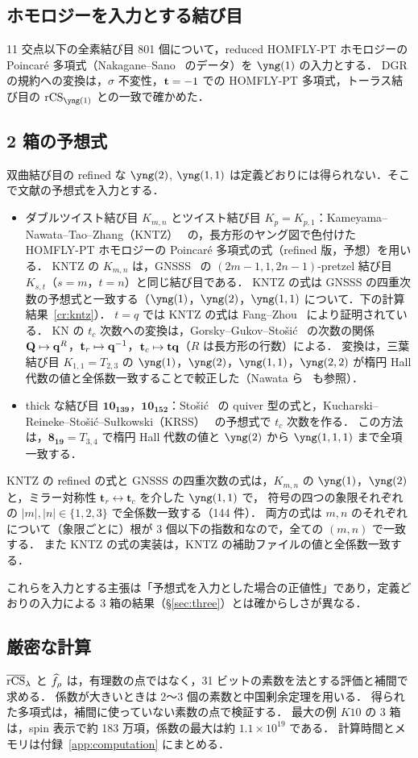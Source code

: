 \subsection{ホモロジーを入力とする結び目}
11 交点以下の全素結び目 801 個について，reduced HOMFLY-PT ホモロジーの Poincaré 多項式（Nakagane--Sano~\cite{Nakagane21} のデータ）を $\yng(1)$ の入力とする．
DGR の規約への変換は，$\sigma$ 不変性，$\mathbf{t}=-1$ での HOMFLY-PT 多項式，トーラス結び目の $\rCS_{\yng(1)}$ との一致で確かめた．

\subsection{2 箱の予想式}
双曲結び目の refined な $\yng(2)$, $\yng(1,1)$ は定義どおりには得られない．そこで文献の予想式を入力とする．
\begin{itemize}
\item ダブルツイスト結び目 $K_{m,n}$ とツイスト結び目 $K_p=K_{p,1}$：Kameyama--Nawata--Tao--Zhang（KNTZ）~\cite{Kameyama19} の，長方形のヤング図で色付けた HOMFLY-PT ホモロジーの Poincaré 多項式の式（refined 版，予想）を用いる．
KNTZ の $K_{m,n}$ は，GNSSS~\cite{Gukov15} の $(2m-1,1,2n-1)$-pretzel 結び目 $K_{s,t}$（$s=m$，$t=n$）と同じ結び目である．
KNTZ の式は GNSSS の四重次数の予想式と一致する（$\yng(1)$，$\yng(2)$，$\yng(1,1)$ について．下の計算結果~\ref{cr:kntz}）．
$t=q$ では KNTZ の式は Fang--Zhou~\cite{Fang26} により証明されている．
KN の $t_c$ 次数への変換は，Gorsky--Gukov--Stošić~\cite{Gorsky13} の次数の関係 $\mathbf{Q}\mapsto\mathbf{q}^R$，$\mathbf{t}_r\mapsto\mathbf{q}^{-1}$，$\mathbf{t}_c\mapsto\mathbf{t}\mathbf{q}$（$R$ は長方形の行数）による．
変換は，三葉結び目 $K_{1,1}=T_{2,3}$ の $\yng(1)$，$\yng(2)$，$\yng(1,1)$，$\yng(2,2)$ が楕円 Hall 代数の値と全係数一致することで較正した（Nawata ら~\cite{Nawata12} も参照）．
\item thick な結び目 $\mathbf{10_{139}}$，$\mathbf{10_{152}}$：Stošić~\cite{Stosic24} の quiver 型の式と，Kucharski--Reineke--Stošić--Sułkowski（KRSS）~\cite{Kucharski17b} の予想式で $t_c$ 次数を作る．
この方法は，$\mathbf{8_{19}}=T_{3,4}$ で楕円 Hall 代数の値と $\yng(2)$ から $\yng(1,1,1)$ まで全項一致する．
\end{itemize}
\begin{compresult}\label{cr:kntz}
KNTZ の refined の式と GNSSS の四重次数の式は，$K_{m,n}$ の $\yng(1)$，$\yng(2)$ と，ミラー対称性 $\mathbf{t}_r\leftrightarrow\mathbf{t}_c$ を介した $\yng(1,1)$ で，
符号の四つの象限それぞれの $|m|,|n|\in\{1,2,3\}$ で全係数一致する（144 件）．
両方の式は $m,n$ のそれぞれについて（象限ごとに）根が 3 個以下の指数和なので，全ての $(m,n)$ で一致する．
また KNTZ の式の実装は，KNTZ の補助ファイルの値と全係数一致する．
\end{compresult}
これらを入力とする主張は「予想式を入力とした場合の正値性」であり，定義どおりの入力による 3 箱の結果（\S\ref{sec:three}）とは確からしさが異なる．

\subsection{厳密な計算}
$\overline{\textrm{rCS}}_\lambda$ と $\widehat{f}_\rho$ は，有理数の点ではなく，31 ビットの素数を法とする評価と補間で求める．
係数が大きいときは 2〜3 個の素数と中国剰余定理を用いる．
得られた多項式は，補間に使っていない素数の点で検証する．
最大の例 $K10$ の 3 箱は，spin 表示で約 183 万項，係数の最大は約 $1.1\times10^{19}$ である．
計算時間とメモリは付録~\ref{app:computation} にまとめる．
